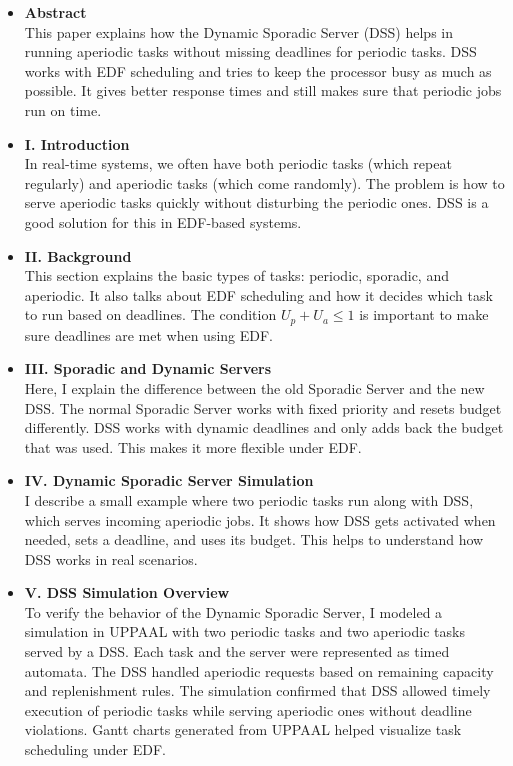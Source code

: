 \documentclass[conference]{IEEEtran}
\begin{document}
\begin{itemize}
    \item \textbf{Abstract} \\
    This paper explains how the Dynamic Sporadic Server (DSS) helps in running aperiodic tasks without missing deadlines for periodic tasks. DSS works with EDF scheduling and tries to keep the processor busy as much as possible. It gives better response times and still makes sure that periodic jobs run on time.

    \item \textbf{I. Introduction} \\
    In real-time systems, we often have both periodic tasks (which repeat regularly) and aperiodic tasks (which come randomly). The problem is how to serve aperiodic tasks quickly without disturbing the periodic ones. DSS is a good solution for this in EDF-based systems.

    \item \textbf{II. Background} \\
    This section explains the basic types of tasks: periodic, sporadic, and aperiodic. It also talks about EDF scheduling and how it decides which task to run based on deadlines. The condition \( U_p + U_a \leq 1 \) is important to make sure deadlines are met when using EDF.

    \item \textbf{III. Sporadic and Dynamic Servers} \\
    Here, I explain the difference between the old Sporadic Server and the new DSS. The normal Sporadic Server works with fixed priority and resets budget differently. DSS works with dynamic deadlines and only adds back the budget that was used. This makes it more flexible under EDF.

    \item \textbf{IV. Dynamic Sporadic Server Simulation} \\
    I describe a small example where two periodic tasks run along with DSS, which serves incoming aperiodic jobs. It shows how DSS gets activated when needed, sets a deadline, and uses its budget. This helps to understand how DSS works in real scenarios.

   \item \textbf{V. DSS Simulation Overview} \\
To verify the behavior of the Dynamic Sporadic Server, I modeled a simulation in UPPAAL with two periodic tasks and two aperiodic tasks served by a DSS. Each task and the server were represented as timed automata. The DSS handled aperiodic requests based on remaining capacity and replenishment rules. The simulation confirmed that DSS allowed timely execution of periodic tasks while serving aperiodic ones without deadline violations. Gantt charts generated from UPPAAL helped visualize task scheduling under EDF.



\end{itemize}
\end{document}
